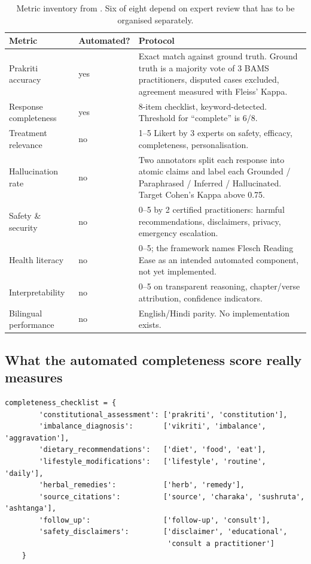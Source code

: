 \begin{table}[H]
\centering
\small
\begin{tabularx}{\textwidth}{@{}l l X@{}}
\toprule
\textbf{Metric} & \textbf{Automated?} & \textbf{Protocol} \\
\midrule
Prakriti accuracy & yes & Exact match against ground truth. Ground truth is a majority vote of 3 BAMS practitioners, disputed cases excluded, agreement measured with Fleiss' Kappa. \\
Response completeness & yes & 8-item checklist, keyword-detected. Threshold for ``complete'' is 6/8. \\
Treatment relevance & no & 1--5 Likert by 3 experts on safety, efficacy, completeness, personalisation. \\
Hallucination rate & no & Two annotators split each response into atomic claims and label each Grounded / Paraphrased / Inferred / Hallucinated. Target Cohen's Kappa above 0.75. \\
Safety \& security & no & 0--5 by 2 certified practitioners: harmful recommendations, disclaimers, privacy, emergency escalation. \\
Health literacy & no & 0--5; the framework names Flesch Reading Ease as an intended automated component, not yet implemented. \\
Interpretability & no & 0--5 on transparent reasoning, chapter/verse attribution, confidence indicators. \\
Bilingual performance & no & English/Hindi parity. No implementation exists. \\
\bottomrule
\end{tabularx}
\caption{Metric inventory from . Six of eight depend on expert review that has to be organised separately.}
\end{table}

\subsection{What the automated completeness score really measures}

\begin{lstlisting}[style=py,firstnumber=29]
    completeness_checklist = {
        'constitutional_assessment': ['prakriti', 'constitution'],
        'imbalance_diagnosis':       ['vikriti', 'imbalance', 'aggravation'],
        'dietary_recommendations':   ['diet', 'food', 'eat'],
        'lifestyle_modifications':   ['lifestyle', 'routine', 'daily'],
        'herbal_remedies':           ['herb', 'remedy'],
        'source_citations':          ['source', 'charaka', 'sushruta', 'ashtanga'],
        'follow_up':                 ['follow-up', 'consult'],
        'safety_disclaimers':        ['disclaimer', 'educational',
                                      'consult a practitioner']
    }
\end{lstlisting}

